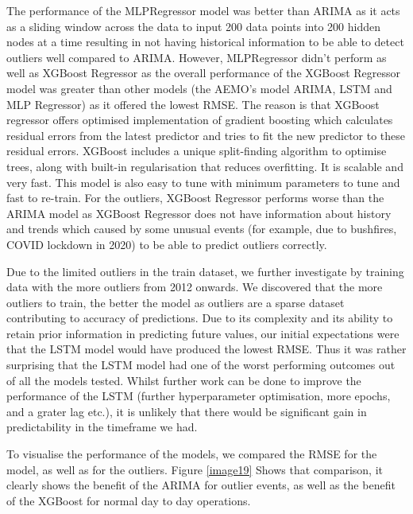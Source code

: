 \documentclass[mstat,12pt]{unswthesis}
\begin{document}
The performance of the MLPRegressor model was better than ARIMA as it
acts as a sliding window across the data to input 200 data points into
200 hidden nodes at a time resulting in not having historical
information to be able to detect outliers well compared to ARIMA.
However, MLPRegressor didn't perform as well as XGBoost Regressor as the
overall performance of the XGBoost Regressor model was greater than
other models (the AEMO's model ARIMA, LSTM and MLP Regressor) as it
offered the lowest RMSE. The reason is that XGBoost regressor offers
optimised implementation of gradient boosting which calculates residual
errors from the latest predictor and tries to fit the new predictor to
these residual errors. XGBoost includes a unique split-finding algorithm
to optimise trees, along with built-in regularisation that reduces
overfitting. It is scalable and very fast. This model is also easy to
tune with minimum parameters to tune and fast to re-train. For the
outliers, XGBoost Regressor performs worse than the ARIMA model as
XGBoost Regressor does not have information about history and trends
which caused by some unusual events (for example, due to bushfires,
COVID lockdown in 2020) to be able to predict outliers correctly.

Due to the limited outliers in the train dataset, we further investigate
by training data with the more outliers from 2012 onwards. We discovered
that the more outliers to train, the better the model as outliers are a
sparse dataset contributing to accuracy of predictions. Due to its
complexity and its ability to retain prior information in predicting
future values, our initial expectations were that the LSTM model would
have produced the lowest RMSE. Thus it was rather surprising that the
LSTM model had one of the worst performing outcomes out of all the
models tested. Whilst further work can be done to improve the
performance of the LSTM (further hyperparameter optimisation, more
epochs, and a grater lag etc.), it is unlikely that there would be
significant gain in predictability in the timeframe we had.

To visualise the performance of the models, we compared the RMSE for the
model, as well as for the outliers. Figure \ref{image19} Shows that
comparison, it clearly shows the benefit of the ARIMA for outlier
events, as well as the benefit of the XGBoost for normal day to day
operations.
\end{document}
